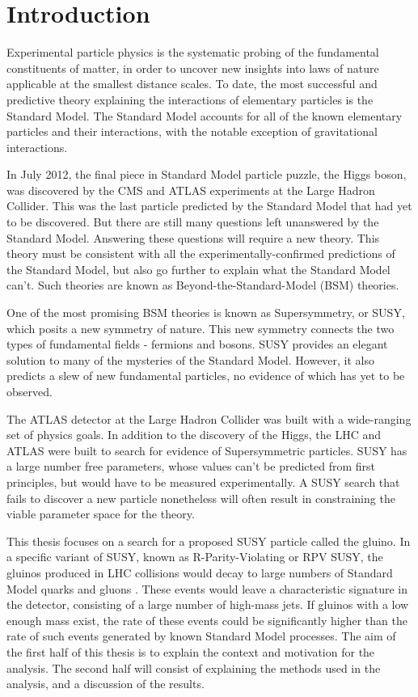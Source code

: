 \chapter{Introduction} \label{ch:intro}

Experimental particle physics is the systematic probing of the fundamental constituents of matter,
in order to uncover new insights into laws of nature applicable at the smallest distance scales.
To date, the most successful and predictive theory explaining the interactions of elementary particles is the Standard Model.
The Standard Model accounts for all of the known elementary particles and their interactions, with the notable exception of gravitational interactions.

In July 2012, the final piece in Standard Model particle puzzle, the Higgs boson, was discovered by the CMS and ATLAS experiments at the
Large Hadron Collider.
This was the last particle predicted by the Standard Model that had yet to be discovered.
But there are still many questions left unanswered by the Standard Model.
Answering these questions will require a new theory.
This theory must be consistent with all the experimentally-confirmed predictions of the Standard Model,
but also go further to explain what the Standard Model can't.
Such theories are known as Beyond-the-Standard-Model (BSM) theories.

One of the most promising BSM theories is known as Supersymmetry, or SUSY, which posits a new symmetry of nature.
This new symmetry connects the two types of fundamental fields - fermions and bosons.
SUSY provides an elegant solution to many of the mysteries of the Standard Model.
However, it also predicts a slew of new fundamental particles, no evidence of which has yet to be observed.

The ATLAS detector at the Large Hadron Collider was built with a wide-ranging set of physics goals.
In addition to the discovery of the Higgs, the LHC and ATLAS were built to search for evidence of Supersymmetric particles.
SUSY has a large number free parameters, whose values can't be predicted from first principles, but would have to be measured experimentally.
A SUSY search that fails to discover a new particle nonetheless will often result in constraining the viable parameter space for the theory.

This thesis focuses on a search for a proposed SUSY particle called the gluino.
In a specific variant of SUSY, known as R-Parity-Violating or RPV SUSY, the gluinos produced in LHC collisions would
decay to large numbers of Standard Model quarks and gluons .
These events would leave a characteristic signature in the detector, consisting of a large number of high-mass jets.
If gluinos with a low enough mass exist, the rate of these events could be significantly higher than the rate of such events
generated by known Standard Model processes.
The aim of the first half of this thesis is to explain the context and motivation for the analysis.
The second half will consist of explaining the methods used in the analysis, and a discussion of the results.

